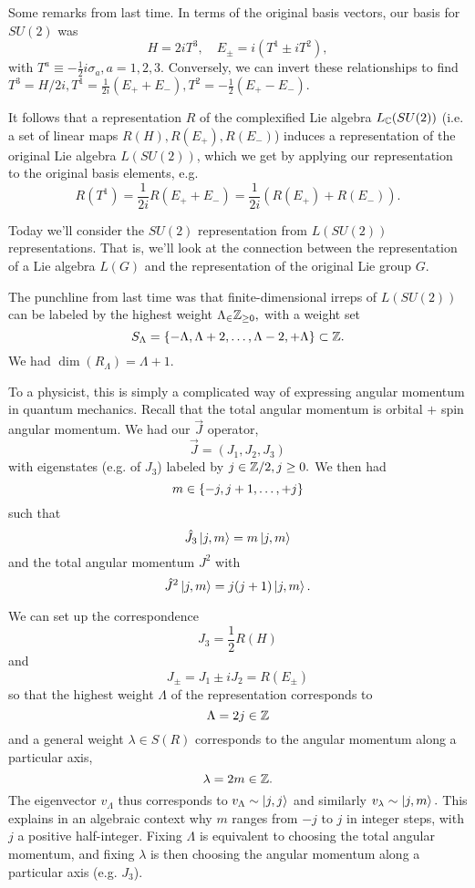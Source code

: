 Some remarks from last time. In terms of the original basis vectors, our basis for $SU(2)$ was
$$H=2i T^3,\quad E_\pm =i(T^1 \pm i T^2),$$
with $T^a\equiv-\frac{1}{2}i \sigma_a, a=1,2,3.$ Conversely, we can invert these relationships to find $T^3=H/2i, T^1=\frac{1}{2i}(E_+ + E_-), T^2= -\frac{1}{2}(E_+-E_-).$

It follows that a representation $R$ of the complexified Lie algebra $L_{\mathbb{C}}(SU(2))$ (i.e. a set of linear maps $R(H),R(E_+),R(E_-)$) induces a representation of the original Lie algebra $L(SU(2))$, which we get by applying our representation to the original basis elements, e.g.
$$R(T^1)=\frac{1}{2i} R(E_+ + E_-)=\frac{1}{2i}(R(E_+)+R(E_-)).$$

Today we'll consider the $SU(2)$ representation from $L(SU(2))$ representations. That is, we'll look at the connection between the representation of a Lie algebra $L(G)$ and the representation of the original Lie group $G$.

The punchline from last time was that finite-dimensional irreps of $L(SU(2))$ can be labeled by the highest weight $\Lambda_\in \mathbb{Z}_{\geq 0},$ with a weight set
$$S_\Lambda=\{-\Lambda, \Lambda+2,\ldots, \Lambda-2, +\Lambda\}\subset \mathbb{Z}.$$
We had $\dim(R_\Lambda)=\Lambda+1$.

To a physicist, this is simply a complicated way of expressing angular momentum in quantum mechanics. Recall that the total angular momentum is orbital $+$ spin angular momentum. We had our $\vec J$ operator,
$$\vec J=(J_1,J_2,J_3)$$ with eigenstates (e.g. of $J_3$) labeled by $j\in \mathbb{Z}/2, j\geq 0.$ We then had
$$m\in \{-j,j+1,\ldots,+j\}$$
such that
$$\hat J_3\left| j,m \right>=m\left| j,m \right>$$
and the total angular momentum $J^2$ with
$$\hat J^2 \left| j,m \right>=j(j+1)\left| j,m \right>.$$

We can set up the correspondence
$$J_3=\frac{1}{2}R(H)$$
and
$$J_\pm = J_1\pm i J_2 = R(E_\pm)$$
so that the highest weight $\Lambda$ of the representation corresponds to 
$$\Lambda = 2j \in \mathbb{Z}$$ and a general weight $\lambda \in S(R)$ corresponds to the angular momentum along a particular axis,
$$\lambda = 2m\in \mathbb{Z}.$$
The eigenvector $v_\Lambda$ thus corresponds to
$v_\Lambda \sim \left| j,j \right>$ and similarly $v_\lambda \sim \left| j,m \right>.$
This explains in an algebraic context why $m$ ranges from $-j$ to $j$ in integer steps, with $j$ a positive half-integer. Fixing $\Lambda$ is equivalent to choosing the total angular momentum, and fixing $\lambda$ is then choosing the angular momentum along a particular axis (e.g. $J_3$).

